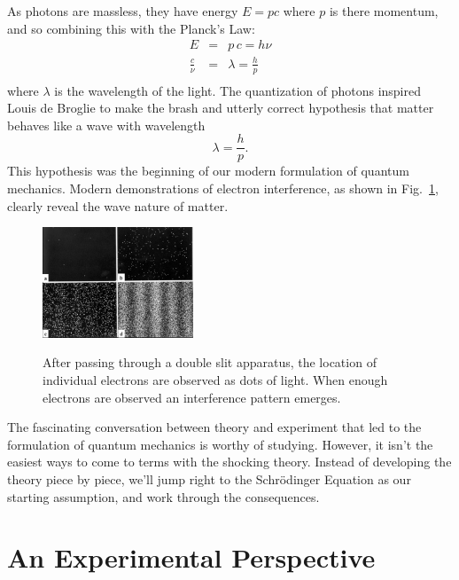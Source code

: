 \documentclass[12pt]{book}
\begin{document}
\noindent
As photons are massless, they have energy $E = pc$ where $p$ is there momentum, and so combining this with the Planck's Law:
\begin{eqnarray*}
E &=& p\,c = h \nu \\
\frac{c}{\nu} &=& \lambda = \frac{h}{p}\\
\end{eqnarray*}
where $\lambda$ is the wavelength of the light.  The quantization of photons inspired Louis de Broglie to make the brash and utterly correct hypothesis that matter behaves like a wave with wavelength
$$ \lambda = \frac{h}{p}.$$
This hypothesis was the beginning of our modern formulation of quantum mechanics.  Modern demonstrations of electron interference, as shown in Fig.~\ref{fig:elecint}, clearly reveal the wave nature of matter.

\begin{figure}[thb]
\begin{center}
{\includegraphics[width=0.40\textwidth]{figs/electron_interference.jpg}}
\end{center}
\caption{\label{fig:elecint} After passing through a double slit apparatus, the location of individual electrons are observed as dots of light.  When enough electrons are observed an interference pattern emerges.}
\end{figure}

The fascinating conversation between theory and experiment that led to the formulation of quantum mechanics is worthy of studying.  However, it isn't the easiest ways to come to terms with the shocking theory.  Instead of developing the theory piece by piece, we'll jump right to the Schr\"odinger Equation as our starting assumption, and work through the consequences.

\section{An Experimental Perspective}
\end{document}
